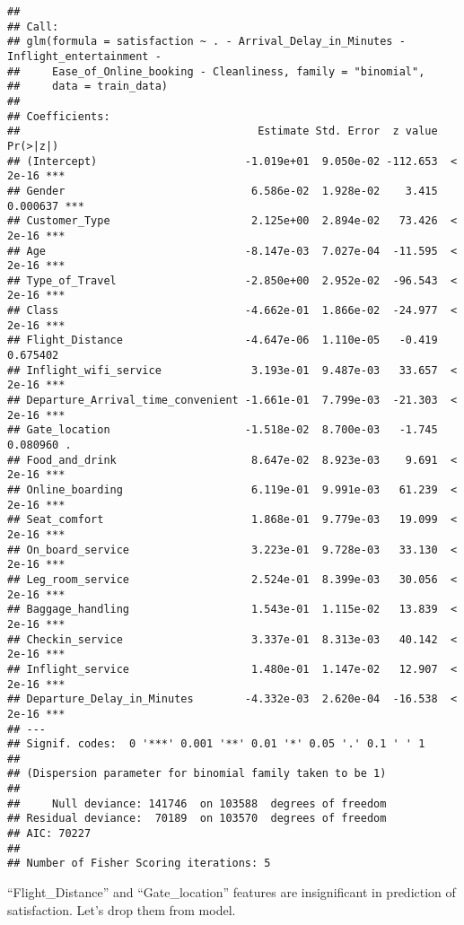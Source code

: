 \documentclass[
]{article}
\begin{document}
\begin{verbatim}
## 
## Call:
## glm(formula = satisfaction ~ . - Arrival_Delay_in_Minutes - Inflight_entertainment - 
##     Ease_of_Online_booking - Cleanliness, family = "binomial", 
##     data = train_data)
## 
## Coefficients:
##                                     Estimate Std. Error  z value Pr(>|z|)    
## (Intercept)                       -1.019e+01  9.050e-02 -112.653  < 2e-16 ***
## Gender                             6.586e-02  1.928e-02    3.415 0.000637 ***
## Customer_Type                      2.125e+00  2.894e-02   73.426  < 2e-16 ***
## Age                               -8.147e-03  7.027e-04  -11.595  < 2e-16 ***
## Type_of_Travel                    -2.850e+00  2.952e-02  -96.543  < 2e-16 ***
## Class                             -4.662e-01  1.866e-02  -24.977  < 2e-16 ***
## Flight_Distance                   -4.647e-06  1.110e-05   -0.419 0.675402    
## Inflight_wifi_service              3.193e-01  9.487e-03   33.657  < 2e-16 ***
## Departure_Arrival_time_convenient -1.661e-01  7.799e-03  -21.303  < 2e-16 ***
## Gate_location                     -1.518e-02  8.700e-03   -1.745 0.080960 .  
## Food_and_drink                     8.647e-02  8.923e-03    9.691  < 2e-16 ***
## Online_boarding                    6.119e-01  9.991e-03   61.239  < 2e-16 ***
## Seat_comfort                       1.868e-01  9.779e-03   19.099  < 2e-16 ***
## On_board_service                   3.223e-01  9.728e-03   33.130  < 2e-16 ***
## Leg_room_service                   2.524e-01  8.399e-03   30.056  < 2e-16 ***
## Baggage_handling                   1.543e-01  1.115e-02   13.839  < 2e-16 ***
## Checkin_service                    3.337e-01  8.313e-03   40.142  < 2e-16 ***
## Inflight_service                   1.480e-01  1.147e-02   12.907  < 2e-16 ***
## Departure_Delay_in_Minutes        -4.332e-03  2.620e-04  -16.538  < 2e-16 ***
## ---
## Signif. codes:  0 '***' 0.001 '**' 0.01 '*' 0.05 '.' 0.1 ' ' 1
## 
## (Dispersion parameter for binomial family taken to be 1)
## 
##     Null deviance: 141746  on 103588  degrees of freedom
## Residual deviance:  70189  on 103570  degrees of freedom
## AIC: 70227
## 
## Number of Fisher Scoring iterations: 5
\end{verbatim}

``Flight\_Distance'' and ``Gate\_location'' features are insignificant
in prediction of satisfaction. Let's drop them from model.
\end{document}
